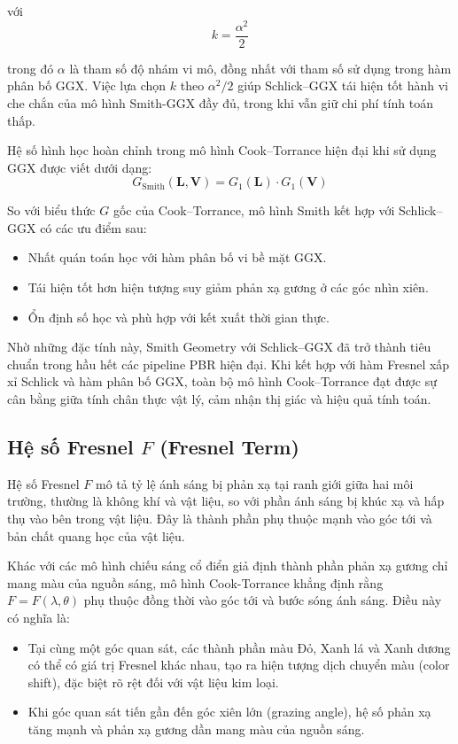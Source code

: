 với
\begin{equation}
	k = \frac{\alpha^2}{2}
\end{equation}

trong đó $\alpha$ là tham số độ nhám vi mô, đồng nhất với tham số sử dụng trong hàm phân bố GGX. Việc lựa chọn $k$ theo $\alpha^2 / 2$ giúp Schlick--GGX tái hiện tốt hành vi che chắn của mô hình Smith-GGX đầy đủ, trong khi vẫn giữ chi phí tính toán thấp.

Hệ số hình học hoàn chỉnh trong mô hình Cook--Torrance hiện đại khi sử dụng GGX được viết dưới dạng:
\begin{equation}
	G_{\text{Smith}}(\mathbf{L}, \mathbf{V}) =
	G_1(\mathbf{L}) \cdot G_1(\mathbf{V})
\end{equation}

So với biểu thức $G$ gốc của Cook–Torrance, mô hình Smith kết hợp với Schlick--GGX có các ưu điểm sau:
\begin{itemize}
	\item Nhất quán toán học với hàm phân bố vi bề mặt GGX.
	\item Tái hiện tốt hơn hiện tượng suy giảm phản xạ gương ở các góc nhìn xiên.
	\item Ổn định số học và phù hợp với kết xuất thời gian thực.
\end{itemize}

Nhờ những đặc tính này, Smith Geometry với Schlick--GGX đã trở thành tiêu chuẩn trong hầu hết các pipeline PBR hiện đại. Khi kết hợp với hàm Fresnel xấp xỉ Schlick và hàm phân bố GGX, toàn bộ mô hình Cook--Torrance đạt được sự cân bằng giữa tính chân thực vật lý, cảm nhận thị giác và hiệu quả tính toán.

\subsection{Hệ số Fresnel $F$ (Fresnel Term)}

Hệ số Fresnel $F$ mô tả tỷ lệ ánh sáng bị phản xạ tại ranh giới giữa hai môi trường, thường là không khí và vật liệu, so với phần ánh sáng bị khúc xạ và hấp thụ vào bên trong vật liệu. Đây là thành phần phụ thuộc mạnh vào góc tới và bản chất quang học của vật liệu.

Khác với các mô hình chiếu sáng cổ điển giả định thành phần phản xạ gương chỉ mang màu của nguồn sáng, mô hình Cook-Torrance khẳng định rằng $F=F(\lambda, \theta)$ phụ thuộc đồng thời vào góc tới và bước sóng ánh sáng. Điều này có nghĩa là:

\begin{itemize}
	\item Tại cùng một góc quan sát, các thành phần màu Đỏ, Xanh lá và Xanh dương có thể có giá trị Fresnel khác nhau, tạo ra hiện tượng dịch chuyển màu (color shift), đặc biệt rõ rệt đối với vật liệu kim loại.
	\item Khi góc quan sát tiến gần đến góc xiên lớn (grazing angle), hệ số phản xạ tăng mạnh và phản xạ gương dần mang màu của nguồn sáng.
\end{itemize}

